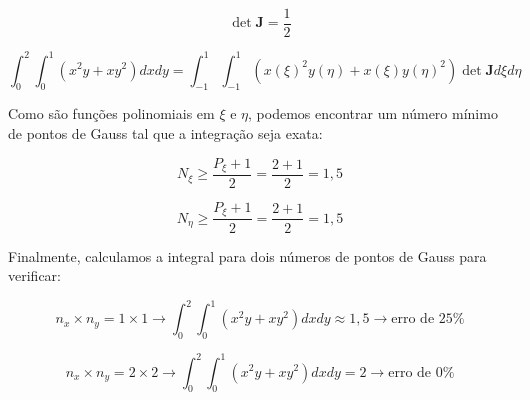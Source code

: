         \begin{equation*}
            \det \mathbf{J} = 
            \frac{1}{2}
        \end{equation*}

        \begin{equation*}
            \int_{0}^{2} \int_{0}^{1} (x^2y + xy^2) dx dy = 
            \int_{-1}^{1} \int_{-1}^{1} (x(\xi)^2y(\eta) + x(\xi)y(\eta)^2) \det \mathbf{J} d\xi d\eta 
        \end{equation*}

        Como são funções polinomiais em $\xi$ e $\eta$, podemos encontrar um número mínimo de pontos de Gauss tal que a integração seja exata:

        \begin{equation*}
            N_\xi \geq \frac{P_\xi+1}{2} = \frac{2+1}{2} = 1,5
        \end{equation*}

        \begin{equation*}
            N_\eta \geq \frac{P_\xi+1}{2} = \frac{2+1}{2} = 1,5
        \end{equation*}

        Finalmente, calculamos a integral para dois números de pontos de Gauss para verificar:

        \begin{equation*}
            n_x \times n_y =  1 \times 1 \rightarrow \int_{0}^{2} \int_{0}^{1} (x^2y + xy^2) dx dy \approx  1,5\rightarrow \text{erro de } 25\% 
        \end{equation*}

        \begin{equation*}
            n_x \times n_y =  2 \times 2 \rightarrow \int_{0}^{2} \int_{0}^{1} (x^2y + xy^2) dx dy =  2 \rightarrow \text{erro de } 0\% 
        \end{equation*}
